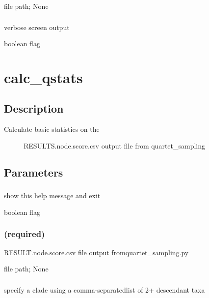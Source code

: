 \documentclass[letterpaper,12pt,english]{sphinxmanual}
\begin{document}
 file path;  None


\subsubsection{}
\label{\detokenize{prog_desc:id13}}
 verbose screen output

 boolean flag


\section{calc\_qstats}
\label{\detokenize{prog_desc:calc-qstats}}

\subsection{Description}
\label{\detokenize{prog_desc:id14}}\begin{description}
\item[{Calculate basic statistics on the}] \leavevmode
RESULTS.node.score.csv output file
from quartet\_sampling

\end{description}


\subsection{Parameters}
\label{\detokenize{prog_desc:id15}}

\subsubsection{}
\label{\detokenize{prog_desc:id16}}
 show this help message and exit

 boolean flag


\subsubsection{ (required)}
\label{\detokenize{prog_desc:data-required}}
 RESULT.node.score.csv file output fromquartet\_sampling.py

 file path;  None


\subsubsection{}
\label{\detokenize{prog_desc:id17}}
 specify a clade using a comma-separatedlist of 2+ descendant taxa
\end{document}
